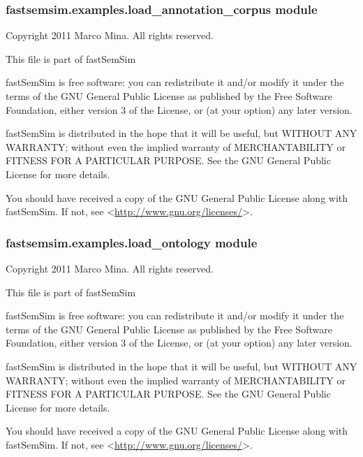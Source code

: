 \documentclass[letterpaper,10pt,english]{sphinxmanual}
\begin{document}
\subsubsection{fastsemsim.examples.load\_annotation\_corpus module}
\label{fastsemsim.examples:module-fastsemsim.examples.load_annotation_corpus}\label{fastsemsim.examples:fastsemsim-examples-load-annotation-corpus-module}
Copyright 2011 Marco Mina. All rights reserved.

This file is part of fastSemSim

fastSemSim is free software: you can redistribute it and/or modify
it under the terms of the GNU General Public License as published by
the Free Software Foundation, either version 3 of the License, or
(at your option) any later version.

fastSemSim is distributed in the hope that it will be useful,
but WITHOUT ANY WARRANTY; without even the implied warranty of
MERCHANTABILITY or FITNESS FOR A PARTICULAR PURPOSE.  See the
GNU General Public License for more details.

You should have received a copy of the GNU General Public License
along with fastSemSim.  If not, see \textless{}\href{http://www.gnu.org/licenses/}{http://www.gnu.org/licenses/}\textgreater{}.


\subsubsection{fastsemsim.examples.load\_ontology module}
\label{fastsemsim.examples:module-fastsemsim.examples.load_ontology}\label{fastsemsim.examples:fastsemsim-examples-load-ontology-module}
Copyright 2011 Marco Mina. All rights reserved.

This file is part of fastSemSim

fastSemSim is free software: you can redistribute it and/or modify
it under the terms of the GNU General Public License as published by
the Free Software Foundation, either version 3 of the License, or
(at your option) any later version.

fastSemSim is distributed in the hope that it will be useful,
but WITHOUT ANY WARRANTY; without even the implied warranty of
MERCHANTABILITY or FITNESS FOR A PARTICULAR PURPOSE.  See the
GNU General Public License for more details.

You should have received a copy of the GNU General Public License
along with fastSemSim.  If not, see \textless{}\href{http://www.gnu.org/licenses/}{http://www.gnu.org/licenses/}\textgreater{}.
\end{document}
